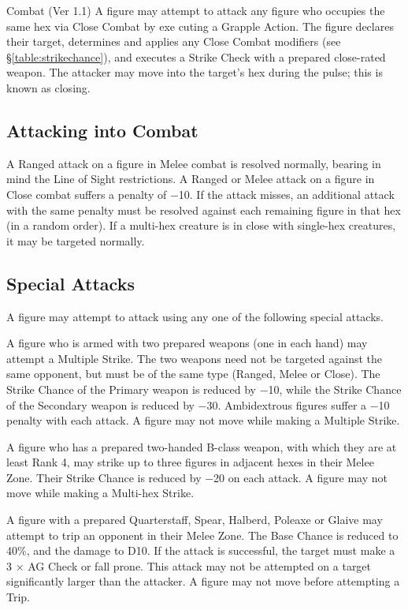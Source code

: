 \begin{Chapter}{Combat (Ver 1.1)}
A figure may attempt to attack any figure who occupies the same hex
via Close Combat by exe cuting a Grapple Action.  The figure declares
their target, determines and applies any Close Combat modifiers (see
\S\ref{table:strikechance}), and executes a Strike Check with a
prepared close-rated weapon.  The attacker may move into the target’s
hex during the pulse; this is known as closing.

\subsection{Attacking into Combat}

A Ranged attack on a figure in Melee combat is resolved normally,
bearing in mind the Line of Sight restrictions.  A Ranged or Melee
attack on a figure in Close combat suffers a penalty of −10.  If the
attack misses, an additional attack with the same penalty must be
resolved against each remaining figure in that hex (in a random
order). If a multi-hex creature is in close with single-hex creatures,
it may be targeted normally.

\subsection{Special Attacks}

A figure may attempt to attack using any one of the following special
attacks.

\begin{Description}
  
\item[Multiple Strike] A figure who is armed with two prepared weapons
  (one in each hand) may attempt a Multiple Strike.  The two weapons
  need not be targeted against the same opponent, but must be of the
  same type (Ranged, Melee or Close).  The Strike Chance of the
  Primary weapon is reduced by −10, while the Strike Chance of the
  Secondary weapon is reduced by −30.  Ambidextrous figures suffer a
  −10 penalty with each attack. A figure may not move while making a
  Multiple Strike.

\item[Multi-hex Strike] A figure who has a prepared two-handed B-class
  weapon, with which they are at least Rank 4, may strike up to three
  figures in adjacent hexes in their Melee Zone.  Their Strike Chance
  is reduced by −20 on each attack. A figure may not move while making
  a Multi-hex Strike.

\item[Trip] A figure with a prepared Quarterstaff, Spear, Halberd,
  Poleaxe or Glaive may attempt to trip an opponent in their Melee
  Zone. The Base Chance is reduced to 40\%, and the damage to D10.  If
  the attack is successful, the target must make a 3 × AG Check or
  fall prone.  This attack may not be attempted on a target
  significantly larger than the attacker. A figure may not move before
  attempting a Trip.


\end{Description}
\end{Chapter}
